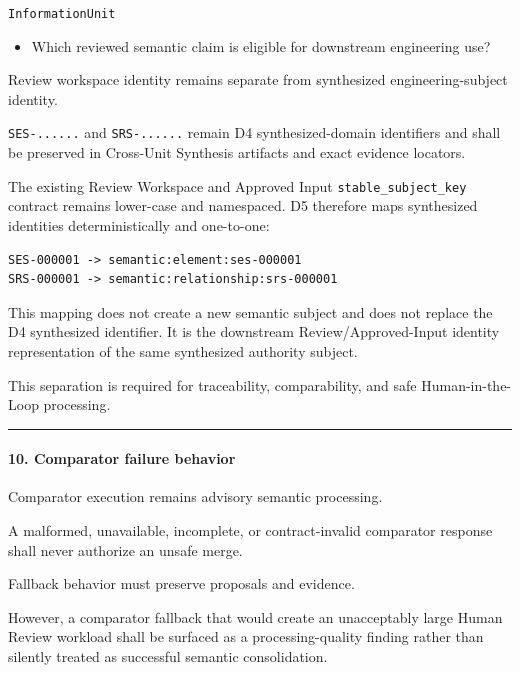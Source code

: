 \texttt{InformationUnit}

\begin{itemize}
\tightlist
\item
  Which reviewed semantic claim is eligible for downstream engineering use?
\end{itemize}

Review workspace identity remains separate from synthesized engineering-subject identity.

\texttt{SES-......} and \texttt{SRS-......} remain D4 synthesized-domain identifiers and shall be preserved in Cross-Unit Synthesis artifacts and exact evidence locators.

The existing Review Workspace and Approved Input \texttt{stable\_subject\_key} contract remains lower-case and namespaced. D5 therefore maps synthesized identities deterministically and one-to-one:

\begin{verbatim}
SES-000001 -> semantic:element:ses-000001
SRS-000001 -> semantic:relationship:srs-000001
\end{verbatim}

This mapping does not create a new semantic subject and does not replace the D4 synthesized identifier. It is the downstream Review/Approved-Input identity representation of the same synthesized authority subject.

This separation is required for traceability, comparability, and safe Human-in-the-Loop processing.

\begin{center}\rule{0.5\linewidth}{0.5pt}\end{center}

\hypertarget{10-comparator-failure-behavior}{%
\paragraph{10. Comparator failure behavior}\label{10-comparator-failure-behavior}}

Comparator execution remains advisory semantic processing.

A malformed, unavailable, incomplete, or contract-invalid comparator response shall never authorize an unsafe merge.

Fallback behavior must preserve proposals and evidence.

However, a comparator fallback that would create an unacceptably large Human Review workload shall be surfaced as a processing-quality finding rather than silently treated as successful semantic consolidation.

